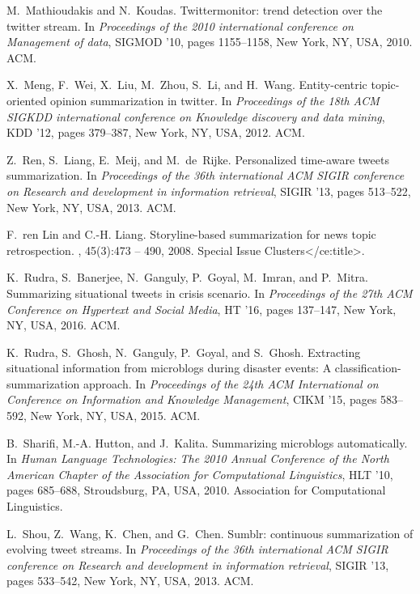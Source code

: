 \documentclass{llncs}
\begin{document}
\begin{thebibliography}{10}
M.~Mathioudakis and N.~Koudas.
\newblock Twittermonitor: trend detection over the twitter stream.
\newblock In {\em Proceedings of the 2010 international conference on
  Management of data}, SIGMOD '10, pages 1155--1158, New York, NY, USA, 2010.
  ACM.

X.~Meng, F.~Wei, X.~Liu, M.~Zhou, S.~Li, and H.~Wang.
\newblock Entity-centric topic-oriented opinion summarization in twitter.
\newblock In {\em Proceedings of the 18th ACM SIGKDD international conference
  on Knowledge discovery and data mining}, KDD '12, pages 379--387, New York,
  NY, USA, 2012. ACM.

Z.~Ren, S.~Liang, E.~Meij, and M.~de~Rijke.
\newblock Personalized time-aware tweets summarization.
\newblock In {\em Proceedings of the 36th international ACM SIGIR conference on
  Research and development in information retrieval}, SIGIR '13, pages
  513--522, New York, NY, USA, 2013. ACM.

F.~ren Lin and C.-H. Liang.
\newblock Storyline-based summarization for news topic retrospection.
, 45(3):473 -- 490, 2008.
Special Issue Clusters</ce:title>.

K.~Rudra, S.~Banerjee, N.~Ganguly, P.~Goyal, M.~Imran, and P.~Mitra.
\newblock Summarizing situational tweets in crisis scenario.
\newblock In {\em Proceedings of the 27th ACM Conference on Hypertext and
  Social Media}, HT '16, pages 137--147, New York, NY, USA, 2016. ACM.

K.~Rudra, S.~Ghosh, N.~Ganguly, P.~Goyal, and S.~Ghosh.
\newblock Extracting situational information from microblogs during disaster
  events: A classification-summarization approach.
\newblock In {\em Proceedings of the 24th ACM International on Conference on
  Information and Knowledge Management}, CIKM '15, pages 583--592, New York,
  NY, USA, 2015. ACM.

B.~Sharifi, M.-A. Hutton, and J.~Kalita.
\newblock Summarizing microblogs automatically.
\newblock In {\em Human Language Technologies: The 2010 Annual Conference of
  the North American Chapter of the Association for Computational Linguistics},
  HLT '10, pages 685--688, Stroudsburg, PA, USA, 2010. Association for
  Computational Linguistics.

L.~Shou, Z.~Wang, K.~Chen, and G.~Chen.
\newblock Sumblr: continuous summarization of evolving tweet streams.
\newblock In {\em Proceedings of the 36th international ACM SIGIR conference on
  Research and development in information retrieval}, SIGIR '13, pages
  533--542, New York, NY, USA, 2013. ACM.


\end{thebibliography}
\end{document}
